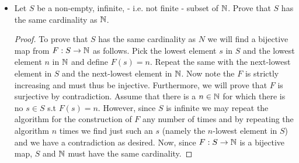 \begin{itemize}
\begin{proof}
and thus $G$ must be strictly increasing (for values along the diagonals) and is therefore injective.\par
We will prove that $G$ is surjective by induction. Namely we will prove that if there exists a tuple $(x,y)$ in $\N\times\N$ that maps to $n$ under $G$, then there must exist a tuple $(x',y')$ in $\N\times\N$ that maps to $n+1=G(x,y)+1$ under $G$. For the base case note that $G(1,1)=1$. For the inductive step, consider any tuple $(x,y)$ in $\N\times\N$. Now there are two cases: 
\begin{enumerate}
\item $y\neq 1$: In this case we set $(x',y')=(x+1,y-1)$. Now $G(x',y')-G(x,y)=1$ as desired (since $\dfrac{(x+y-2)(x+y-1)}{2}$ remains constant along the diagonal). 
\item $y==n$. This this case we have $(x',y')=(1,x+y)$ (i.e. we're moving to the next diagonal). Now
\[ G(x',y')-G(x,y) = \dfrac{2(x+y-1)}{2} - x + 1 = x - x +1 = 1 \]
as desired. Thus $G$ is both injective and surjective (i.e. it's bijective). \par
{} Even though this problem was done for straight diagonals rather than alternating diagonals, one could of course also construct a straight diagonal map with diagonals from $(n,1)$, $(n,1)$, which will lead to a bijective map by a similar argument and then one could write the bijective map over alternating diagonals as a union over those two maps for even and odd $n$ respectively. 
\end{enumerate}
\end{proof}
\item Let $S$ be a non-empty, infinite, - i.e. not finite - subset of $\mathbb{N}$. Prove that $S$ has the same cardinality as $\mathbb{N}$.
\begin{proof}
To prove that $S$ has the same cardinality as $N$ we will find a bijective map from $F: S\to \mathbb{N}$ as follows. Pick the lowest element $s$ in $S$ and the lowest element $n$ in $\mathbb{N}$ and define $F(s)=n$. Repeat the same with the next-lowest element in $S$ and the next-lowest element in $\mathbb{N}$. Now note the $F$ is strictly increasing and must thus be injective. Furthermore, we will prove that $F$ is surjective by contradiction. Assume that there is a $n \in \mathbb{N}$ for which there is no $s \in S$ s.t $F(s) = n$. However, since $S$ is infinite we may repeat the algorithm for the construction of $F$ any number of times and by repeating the algorithm $n$ times we find just such an $s$ (namely the $n$-lowest element in $S$) and we have a contradiction as desired. Now, since $F: S\to \mathbb{N}$ is a bijective map, $S$ and $\mathbb{N}$ must have the same cardinality. 

\end{proof}
\end{itemize}
